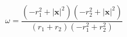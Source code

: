 $$
\omega = \frac{\left(- r_1^{2} + \lvert\mathbf x\rvert^2\right) \left(- r_2^{2} + \lvert\mathbf x\rvert^2\right)}{\left(r_1 + r_2\right) \left(- r_1^{2} + r_2^{2}\right)}
$$
